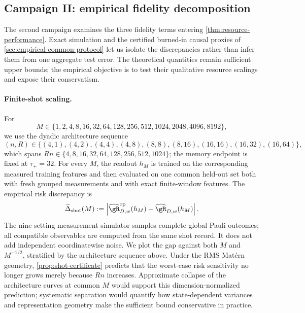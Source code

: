 \subsection{Campaign II: empirical fidelity decomposition}
\label{sec:empirical-fidelity}

The second campaign examines the three fidelity terms entering
\cref{thm:resource-performance}.  Exact simulation and the certified burned-in
causal proxies of \cref{sec:empirical-common-protocol} let us isolate the
discrepancies rather than infer them from one aggregate test error.  The theoretical quantities remain sufficient upper
bounds; the empirical objective is to test their qualitative resource
scalings and expose their conservatism.

\paragraph{Finite-shot scaling.}
For
\begin{equation}
    M\in\{1,2,4,8,16,32,64,128,256,512,1024,2048,4096,8192\},
    \label{eq:M-grid}
\end{equation}
we use the dyadic architecture sequence
\[
(n,R)\in\{(4,1),(4,2),(4,4),(4,8),(8,8),(8,16),
(16,16),(16,32),(16,64)\},
\]
which spans $Rn\in\{4,8,16,32,64,128,256,512,1024\}$; the
memory endpoint is fixed at $\tau_+=32$.  For every $M$,
the readout $h_M$ is trained on the corresponding
measured training features and then evaluated on one common held-out set both
with fresh grouped measurements and with exact finite-window features.  The empirical risk discrepancy is
\begin{equation}
    \widehat\Delta_{\mathrm{shot}}(M)
    :=\left|
        \widehat\risk^{\mathrm{op}}_{D,w}(h_M)
        -\widehat\risk_{D,w}(h_M)
      \right|.
    \label{eq:empirical-shot-gap}
\end{equation}
The nine-setting measurement simulator samples complete global Pauli outcomes;
all compatible observables are computed from the same shot record.  It does
not add independent coordinatewise noise.  We plot the gap against both $M$
and $M^{-1/2}$, stratified by the architecture sequence above.  Under the RMS
Mat\'ern geometry, \cref{prop:shot-certificate} predicts that the worst-case
risk sensitivity no longer grows merely because $Rn$ increases.  Approximate
collapse of the architecture curves at common $M$ would support this
dimension-normalized prediction; systematic separation would quantify how
state-dependent variances and representation geometry make the sufficient
bound conservative in practice.

